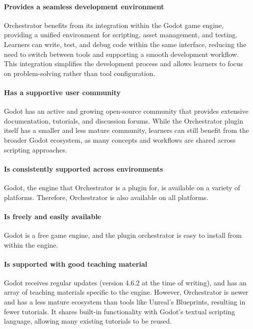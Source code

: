 \paragraph{Provides a seamless development environment}
Orchestrator benefits from its integration within the Godot game engine, providing a unified environment for scripting, asset management, and testing.
Learners can write, test, and debug code within the same interface, reducing the need to switch between tools and supporting a smooth development workflow.
This integration simplifies the development process and allows learners to focus on problem-solving rather than tool configuration.

\paragraph{Has a supportive user community}
Godot has an active and growing open-source community that provides extensive documentation, tutorials, and discussion forums.
While the Orchestrator plugin itself has a smaller and less mature community, learners can still benefit from the broader Godot ecosystem, as many concepts and workflows are shared across scripting approaches.

\paragraph{Is consistently supported across environments}

Godot, the engine that Orchestrator is a plugin for, is available on a variety of platforms.
Therefore, Orchestrator is also available on all platforms.

\paragraph{Is freely and easily available}

Godot is a free game engine, and the plugin orchestrator is easy to install from within the engine.

\paragraph{Is supported with good teaching material}

Godot receives regular updates (version 4.6.2 at the time of writing), and has an array of teaching materials specific to the engine.
However, Orchestrator is newer and has a less mature ecosystem than tools like Unreal’s Blueprints, resulting in fewer tutorials.
It shares built-in functionality with Godot’s textual scripting language, allowing many existing tutorials to be reused.

